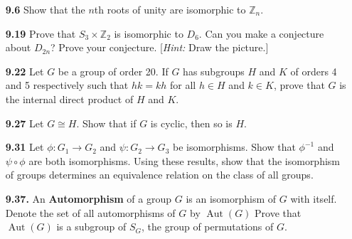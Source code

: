 \documentclass[12pt,reqno]{amsart}
\newcommand{\aut}{\ensuremath{\operatorname{Aut}}}
\newcommand{\<}{\ensuremath{\langle}}
\renewcommand{\>}{\ensuremath{\rangle}}
\begin{document}
\begin{enumerate}[{\bf 1.}]
\vfill


\newpage
{}

\medskip
\item[{\bf 9.6}]
Show that the $n$th roots of unity are isomorphic to ${\mathbb Z}_n$. 
\vfill 

\item[{\bf 9.19}]
Prove that $S_3 \times {\mathbb Z}_2$ is isomorphic to $D_6$. Can you
make a conjecture about $D_{2n}$? Prove your conjecture. [\emph{Hint:}
Draw the picture.] 

\vfill

\item[{\bf 9.22}]
Let $G$ be a group of order 20. If $G$ has subgroups $H$ and $K$ of
orders 4 and 5 respectively such that $hk = kh$ for all $h \in H$ and
$k \in K$, prove that $G$ is the internal direct product of $H$ and $K$. 

\vfill

% 

\item[{\bf 9.27}]
Let $G \cong H$. Show that if $G$ is cyclic, then so is $H$.

\vfill

\item[{\bf 9.31}]
Let $\phi : G_1 \rightarrow G_2$ and  $\psi : G_2 \rightarrow G_3$  be
isomorphisms. Show that  $\phi^{-1}$ and $\psi \circ \phi$ are both
isomorphisms. Using these results, show that the isomorphism of groups
determines an equivalence relation on the class of all groups.

\vfill 


\item[{\bf 9.37.}] An {\bf Automorphism} of a group $G$ is an isomorphism of $G$
with itself. Denote the set of all automorphisms of $G$ by
$\aut(G)$
Prove that  $\aut(G)$ is a subgroup of
$S_G$, the group of permutations of $G$. 


\end{enumerate}
\end{document}
